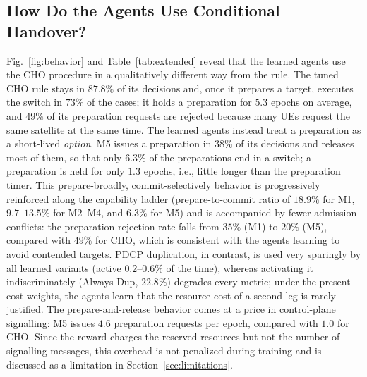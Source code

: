 \documentclass[journal]{IEEEtran}
\begin{document}
\subsection{How Do the Agents Use Conditional Handover?}
Fig.~\ref{fig:behavior} and Table~\ref{tab:extended} reveal that the learned
agents use the CHO procedure in a qualitatively different way from the rule.
The tuned CHO rule stays in $87.8\%$ of its decisions and, once it prepares a
target, executes the switch in $73\%$ of the cases; it holds a preparation for
$5.3$ epochs on average, and $49\%$ of its preparation requests are rejected
because many UEs request the same satellite at the same time. The learned
agents instead treat a preparation as a short-lived \emph{option}. M5 issues a
preparation in $38\%$ of its decisions and releases most of them, so that only
$6.3\%$ of the preparations end in a switch; a preparation is held for only
$1.3$ epochs, i.e., little longer than the preparation timer. This
prepare-broadly, commit-selectively behavior is progressively reinforced
along the capability ladder (prepare-to-commit ratio of $18.9\%$ for M1,
$9.7$--$13.5\%$ for M2--M4, and $6.3\%$ for M5) and is accompanied by fewer
admission conflicts: the preparation rejection rate falls from $35\%$ (M1) to
$20\%$ (M5), compared with $49\%$ for CHO, which is consistent with the agents
learning to avoid contended targets. PDCP duplication, in contrast, is used
very sparingly by all learned variants (active $0.2$--$0.6\%$ of the time),
whereas activating it indiscriminately (Always-Dup, $22.8\%$) degrades every
metric; under the present cost weights, the agents learn that the resource
cost of a second leg is rarely justified. The prepare-and-release behavior
comes at a price in control-plane signalling: M5 issues $4.6$ preparation
requests per epoch, compared with $1.0$ for CHO. Since the reward charges the
reserved resources but not the number of signalling messages, this overhead
is not penalized during training and is discussed as a limitation in
Section~\ref{sec:limitations}.
\end{document}
